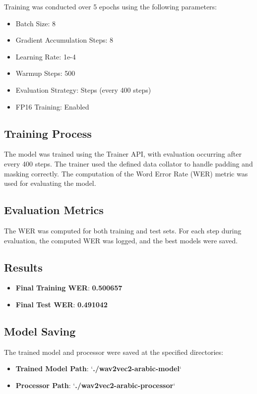 \documentclass[a4paper,12pt]{article}
\begin{document}
Training was conducted over 5 epochs using the following parameters:

\begin{itemize}
    \item Batch Size: 8
    \item Gradient Accumulation Steps: 8
    \item Learning Rate: 1e-4
    \item Warmup Steps: 500
    \item Evaluation Strategy: Steps (every 400 steps)
    \item FP16 Training: Enabled
\end{itemize}

\subsection*{Training Process}

The model was trained using the Trainer API, with evaluation occurring after every 400 steps. The trainer used the defined data collator to handle padding and masking correctly. The computation of the Word Error Rate (WER) metric was used for evaluating the model.

\subsection*{Evaluation Metrics}

The WER was computed for both training and test sets. For each step during evaluation, the computed WER was logged, and the best models were saved.

\subsection*{Results}

\begin{itemize}
    \item \textbf{Final Training WER}: \textbf{0.500657}
    \item \textbf{Final Test WER}: \textbf{0.491042}
\end{itemize}


\subsection*{Model Saving}

The trained model and processor were saved at the specified directories:

\begin{itemize}
    \item \textbf{Trained Model Path}: `\textbf{./wav2vec2-arabic-model}`
    \item \textbf{Processor Path}: `\textbf{./wav2vec2-arabic-processor}`
\end{itemize}
\end{document}
